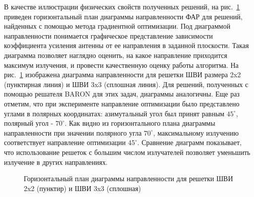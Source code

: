 В качестве иллюстрации физических свойств полученных решений, на рис.~\ref{ris:bve_comp} приведен горизонтальный план диаграммы направленности ФАР для решений, найденных с помощью метода градиентной оптимизации. Под диаграммой направленности понимается графическое представление зависимости коэффициента усиления антенны от ее направления в заданной плоскости. Такая диаграмма позволяет наглядно оценить, на какое направление приходится максимум излучения, и провести качественную оценку работы алгоритма. На рис.~\ref{ris:bve_comp} изображена диаграмма направленности для решетки ШВИ размера 2x2 (пунктирная линия) и ШВИ 3x3 (сплошная линия). Для решений, полученных с помощью решателя BARON для этих задач, диаграммы аналогичны. Еще раз отметим, что при эксперименте направление оптимизации было представлено углами в полярных координатах: азимутальный угол был принят равным $45^{\circ}$, полярный угол - $70^{\circ}$. Как видно из горизонтального плана диаграммы направленности при значении полярного угла $70^{\circ}$, максимальному излучению соответствует направление оптимизации $45^{\circ}$. Сравнение диаграмм показывает, что использование решеток с большим числом излучателей позволяет уменьшить излучение в других направлениях.

\begin{figure}[h]
    \centering
    \vspace{0.7em}
    \caption{Горизонтальный план диаграммы направленности для решетки ШВИ 2x2 (пунктир) и ШВИ 3x3 (сплошная)}
    \label{ris:bve_comp}
\end{figure}

